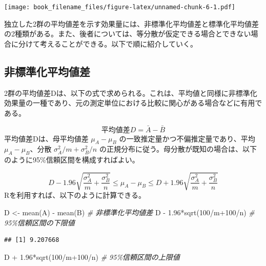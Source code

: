 \documentclass[
  ja=standard, xelatex, base=12pt]{bxjsreport}
\newenvironment{Shaded}{\begin{snugshade}}{\end{snugshade}}
\newcommand{\CommentTok}[1]{\textcolor[rgb]{0.56,0.35,0.01}{\textit{#1}}}
\newcommand{\DecValTok}[1]{\textcolor[rgb]{0.00,0.00,0.81}{#1}}
\newcommand{\FloatTok}[1]{\textcolor[rgb]{0.00,0.00,0.81}{#1}}
\newcommand{\FunctionTok}[1]{\textcolor[rgb]{0.00,0.00,0.00}{#1}}
\newcommand{\NormalTok}[1]{#1}
\newcommand{\OtherTok}[1]{\textcolor[rgb]{0.56,0.35,0.01}{#1}}
\newcommand{\SpecialCharTok}[1]{\textcolor[rgb]{0.00,0.00,0.00}{#1}}
\begin{document}
\texttt{[image: book\_filename\_files/figure-latex/unnamed-chunk-6-1.pdf]}

独立した2群の平均値差を示す効果量には、非標準化平均値差と標準化平均値差の2種類がある。また、後者については、等分散が仮定できる場合とできない場合に分けて考えることができる。以下で順に紹介していく。

\hypertarget{ux975eux6a19ux6e96ux5316ux5e73ux5747ux5024ux5dee}{%
\subsection{非標準化平均値差}\label{ux975eux6a19ux6e96ux5316ux5e73ux5747ux5024ux5dee}}

2群の平均値差Dは、以下の式で求められる。これは、平均値と同様に非標準化効果量の一種であり、元の測定単位における比較に関心がある場合などに有用である。

\[
平均値差D=\bar{A}-\bar{B}
\] 平均値差Dは、母平均値差 \(\mu_A-\mu_B\) の一致推定量かつ不偏推定量であり、平均\(\mu_A-\mu_B\)、分散 \(\sigma_A^2/m+\sigma_B^2/n\) の正規分布に従う。母分散が既知の場合は、以下のように95\%信頼区間を構成すればよい。

\[
D-1.96\sqrt{\frac{\sigma_A^2}{m}+\frac{\sigma_B^2}{n}}\leq\mu_A-\mu_B\leq D+1.96\sqrt{\frac{\sigma_A^2}{m}+\frac{\sigma_B^2}{n}}
\] Rを利用すれば、以下のように計算できる。

\begin{Shaded}
\begin{Highlighting}[]
\NormalTok{D }\OtherTok{\textless{}{-}} \FunctionTok{mean}\NormalTok{(A) }\SpecialCharTok{{-}} \FunctionTok{mean}\NormalTok{(B)     }\CommentTok{\# 非標準化平均値差}
\NormalTok{D }\SpecialCharTok{{-}} \FloatTok{1.96}\SpecialCharTok{*}\FunctionTok{sqrt}\NormalTok{(}\DecValTok{100}\SpecialCharTok{/}\NormalTok{m}\SpecialCharTok{+}\DecValTok{100}\SpecialCharTok{/}\NormalTok{n) }\CommentTok{\# 95\%信頼区間の下限値}
\end{Highlighting}
\end{Shaded}

\begin{verbatim}
## [1] 9.207668
\end{verbatim}

\begin{Shaded}
\begin{Highlighting}[]
\NormalTok{D }\SpecialCharTok{+} \FloatTok{1.96}\SpecialCharTok{*}\FunctionTok{sqrt}\NormalTok{(}\DecValTok{100}\SpecialCharTok{/}\NormalTok{m}\SpecialCharTok{+}\DecValTok{100}\SpecialCharTok{/}\NormalTok{n) }\CommentTok{\# 95\%信頼区間の上限値}
\end{Highlighting}
\end{Shaded}
\end{document}
